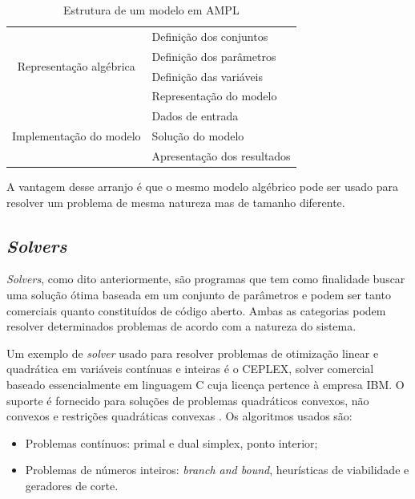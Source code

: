 \begin{table}[H]
    \centering
    \caption{Estrutura de um modelo em AMPL}
    \begin{tabular}{|c|l|}
        \hline
        \multirow{4}{*}{Representação algébrica} & Definição dos conjuntos\\ & Definição dos parâmetros\\ & Definição das variáveis\\ & Representação do modelo\\ \hline
        
        
        \multirow{3}{*}{Implementação do modelo} & Dados de entrada\\ & Solução do modelo\\ & Apresentação dos resultados\\
        \hline
    \end{tabular}
    \label{tab:estrut_AMPL}
\end{table}
    
    \vspace{8pt}
    
A vantagem desse arranjo é que o mesmo modelo algébrico pode ser usado para resolver um problema de mesma natureza mas de tamanho diferente.



\subsection{\emph{Solvers}}

\emph{Solvers}, como dito anteriormente, são programas que tem como finalidade buscar uma solução ótima baseada em um conjunto de parâmetros e podem ser tanto comerciais quanto constituídos de código aberto.
Ambas as categorias podem resolver determinados problemas de acordo com a natureza do sistema.


Um exemplo de \emph{solver} usado para resolver problemas de otimização linear e quadrática em variáveis contínuas e inteiras é o CEPLEX, solver comercial baseado essencialmente em linguagem C cuja licença pertence à empresa IBM.
O suporte é fornecido para soluções de problemas quadráticos convexos, não convexos e restrições quadráticas convexas \cite{amplCEPLEX}. Os algoritmos usados são:

\begin{itemize}
    \item Problemas contínuos: primal e dual simplex, ponto interior;
    
    \item Problemas de números inteiros: \textit{branch and bound}, heurísticas de viabilidade e geradores de corte.
\end{itemize}

